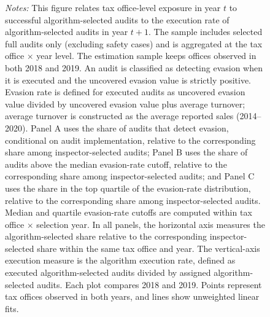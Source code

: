 \documentclass{article}
\begin{document}
\begin{figure}[H]
    \begin{minipage}{\textwidth}
    \footnotesize
    \textit{Notes:} This figure relates tax office-level exposure in year $t$ to successful algorithm-selected audits to the execution rate of algorithm-selected audits in year $t+1$. The sample includes selected full audits only (excluding safety cases) and is aggregated at the tax office $\times$ year level. The estimation sample keeps offices observed in both 2018 and 2019. An audit is classified as detecting evasion when it is executed and the uncovered evasion value is strictly positive. Evasion rate is defined for executed audits as uncovered evasion value divided by uncovered evasion value plus average turnover; average turnover is constructed as the average reported sales (2014--2020). Panel A uses the share of audits that detect evasion, conditional on audit implementation, relative to the corresponding share among inspector-selected audits; Panel B uses the share of audits above the median evasion-rate cutoff, relative to the corresponding share among inspector-selected audits; and Panel C uses the share in the top quartile of the evasion-rate distribution, relative to the corresponding share among inspector-selected audits. Median and quartile evasion-rate cutoffs are computed within tax office $\times$ selection year. In all panels, the horizontal axis measures the algorithm-selected share relative to the corresponding inspector-selected share within the same tax office and year. The vertical-axis execution measure is the algorithm execution rate, defined as executed algorithm-selected audits divided by assigned algorithm-selected audits. Each plot compares 2018 and 2019. Points represent tax offices observed in both years, and lines show unweighted linear fits.
    \end{minipage}
    \end{figure}
\end{document}
